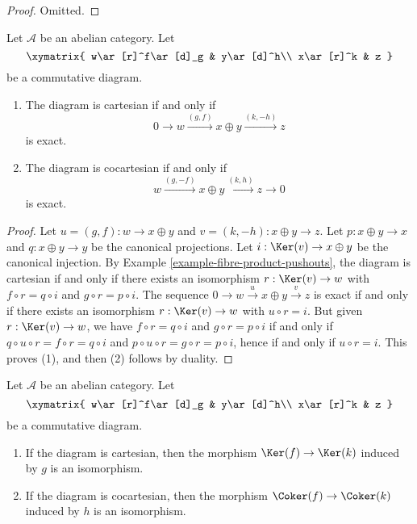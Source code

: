\begin{proof}
Omitted.
\end{proof}

\begin{lemma}
\label{lemma-characterize-cartesian}
Let $\mathcal{A}$ be an abelian category. Let
$$
\xymatrix{
w\ar[r]^f\ar[d]_g
& y\ar[d]^h\\
x\ar[r]^k
& z
}
$$
be a commutative diagram. 
\begin{enumerate}
\item The diagram is cartesian if and only if 
$$
0 \to w \xrightarrow{(g, f)} x \oplus y \xrightarrow{(k, -h)} z
$$
is exact.
\item The diagram is cocartesian if and only if 
$$
w \xrightarrow{(g, -f)} x \oplus y \xrightarrow{(k, h)} z \to 0
$$
is exact.
\end{enumerate}
\end{lemma}

\begin{proof}
Let $u = (g, f) : w \to x \oplus y$ and $v = (k, -h) : x \oplus y \to z$. 
Let $p : x \oplus y \to x$ and $q : x \oplus y \to y$ be the canonical 
projections. Let $i : \Ker(v) \to x \oplus y$ be the canonical 
injection. By Example \ref{example-fibre-product-pushouts}, the diagram is 
cartesian if and only if there exists an isomorphism 
$r : \Ker(v) \to w$ with $f \circ r = q \circ i$ and 
$g \circ r = p \circ i$. The sequence 
$0 \to w \overset{u} \to x \oplus y \overset{v} \to z$ is exact if and 
only if there exists an isomorphism $r : \Ker(v) \to w$ with 
$u \circ r = i$. But given $r : \Ker(v) \to w$, we have 
$f \circ r = q \circ i$ and $g \circ r = p \circ i$ if and 
only if $q \circ u \circ r= f \circ r = q \circ i$ and 
$p \circ u \circ r = g \circ r = p \circ i$, hence if and only if
$u \circ r = i$. This proves (1), and then (2) follows by duality. 
\end{proof}

\begin{lemma}
\label{lemma-cartesian-kernel}
Let $\mathcal{A}$ be an abelian category. Let
$$
\xymatrix{
w\ar[r]^f\ar[d]_g
& y\ar[d]^h\\
x\ar[r]^k
& z
}
$$
be a commutative diagram.
\begin{enumerate}
\item If the diagram is cartesian, then the morphism 
$\Ker(f)\to\Ker(k)$ induced by $g$ is an isomorphism.
\item If the diagram is cocartesian, then the morphism 
$\Coker(f)\to\Coker(k)$ induced by $h$ is an isomorphism.
\end{enumerate}
\end{lemma}

